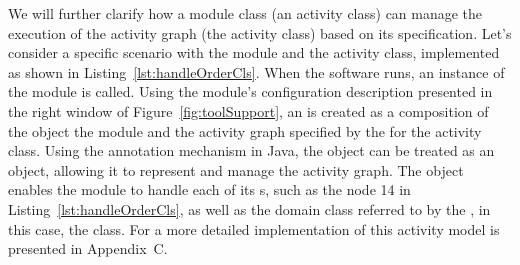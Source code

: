 We will further clarify how a module class (\wrt an activity class) can manage the execution of the activity graph (\wrt the activity class) based on its \agl specification. Let's consider a specific scenario with the  module and the  activity class, implemented as shown in Listing~\ref{lst:handleOrderCls}. When the software runs, an instance of the  module is called. Using the module's configuration description presented in the right window of Figure~\ref{fig:toolSupport}, an  is created as a composition of the  object \wrt the  module and the activity graph specified by the \agl for the  activity class. %
%
Using the annotation mechanism in Java, the  object can be treated as an  object, allowing it to represent and manage the activity graph. The  object enables the  module to handle each of its s, such as the  \wrt node 14 in Listing~\ref{lst:handleOrderCls}, as well as the domain class referred to by the , in this case, the  class. For a more detailed implementation of this activity model is presented in Appendix~C.

